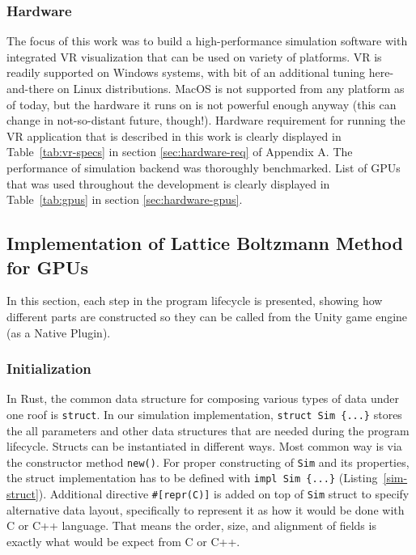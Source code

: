 \subsubsection{Hardware}
The focus of this work was to build a high-performance simulation software with integrated VR visualization that can be used on variety of platforms. VR is readily supported on Windows systems, with bit of an additional tuning here-and-there on Linux distributions. MacOS is not supported from any platform as of today, but the hardware it runs on is not powerful enough anyway (this can change in not-so-distant future, though!). Hardware requirement for running the VR application that is described in this work is clearly displayed in Table~\ref{tab:vr-specs} in section \ref{sec:hardware-req} of Appendix A. The performance of simulation backend was thoroughly benchmarked. List of GPUs that was used throughout the development is clearly displayed in Table~\ref{tab:gpus} in section \ref{sec:hardware-gpus}.


\subsection{Implementation of Lattice Boltzmann Method for GPUs}

In this section, each step in the program lifecycle is presented, showing how different parts are constructed so they can be called from the Unity game engine (as a Native Plugin).

\subsubsection{Initialization}

In Rust, the common data structure for composing various types of data under one roof is \texttt{struct}. In our simulation implementation, \texttt{struct Sim \{...\}} stores the all parameters and other data structures that are needed during the program lifecycle. Structs can be instantiated in different ways. Most common way is via the constructor method \texttt{new()}. For proper constructing of \texttt{Sim} and its properties, the struct implementation has to be defined with \texttt{impl Sim \{...\}} (Listing~\ref{sim-struct}). Additional directive \texttt{\#[repr(C)]} is added on top of \texttt{Sim} struct to specify alternative data layout, specifically to represent it as how it would be done with C or C++ language. That means the order, size, and alignment of fields is exactly what would be expect from C or C++.

